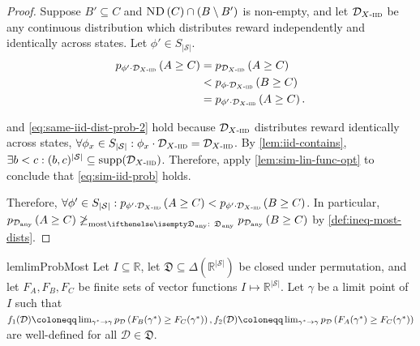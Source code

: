 \documentclass{article}
\renewcommand{\abs}[1]{\left|#1\right|}
\newcommand*{\prn}[1]{\left(#1\right)}
\newcommand*{\defeq}{\coloneqq} %
\newcommand*{\reals}{\mathbb{R}}
\newcommand*{\upsc}[1]{\text{\upshape\textsc{#1}}}
\newcommand*{\St}{\mathcal{S}}
\newcommand*{\rewardVS}{\reals^{\abs{\St}}} %
\newcommand*{\D}{\mathcal{D}} %
\newcommand*{\distSet}{\mathfrak{D}}
\newcommand*{\Dany}{\D_{\text{any}}}
\newcommand*{\DSetAny}{\distSet_\text{any}}
\newcommand*{\ND}[1]{\upsc{ND}\prn{#1}}
\newcommand*{\mdpPermGroup}{S_{\abs{\St}}}
\theoremstyle{definition}
\begin{document}
\begin{appendices}
\begin{proof}
Suppose $B'\subseteq C$ and $\ND{C}\cap \prn{B\setminus B'}$ is non-empty, and let $\Diid$ be any continuous distribution which distributes reward independently and identically across states. Let $\phi'\in\mdpPermGroup$.
\begin{align}
\phelper{A\geq C}[\phi'\cdot \Diid]&=\phelper{A\geq C}[\Diid]\label{eq:same-iid-dist-prob}\\
&<\phelper{B\geq C}[\phi\cdot \Diid]\label{eq:sim-iid-prob}\\
&=\phelper{A\geq C}[\phi'\cdot \Diid].\label{eq:same-iid-dist-prob-2}
\end{align}

 and \cref{eq:same-iid-dist-prob-2} hold because $\Diid$ distributes reward identically across states, $\forall \phi_x\in\mdpPermGroup: \phi_x\cdot \Diid=\Diid$. By \cref{lem:iid-contains}, $\exists b<c: (b,c)^{\abs{\St}}\subseteq \supp[\Diid]$. Therefore, apply \cref{lem:sim-lin-func-opt} to conclude that \cref{eq:sim-iid-prob} holds. 

Therefore, $\forall \phi'\in\mdpPermGroup:\phelper{A\geq C}[\phi'\cdot \Diid]<\phelper{B\geq C}[\phi'\cdot \Diid]$. In particular, $\phelper{A\geq C}[\Dany] \not\geqMost[][\DSetAny] \phelper{B \geq C}[\Dany]$ by \cref{def:ineq-most-dists}.
\end{proof}

\begin{restatable}{lem}{limProbMost}\label{lem:lim-prob-most}
Let $I\subseteq \reals$, let $\distSet \subseteq \Delta(\rewardVS)$ be closed under permutation, and let $F_A,F_B,F_C$ be finite sets of vector functions $I\mapsto \rewardVS$. Let $\gamma$ be a limit point of $I$ such that $f_1(\D)\defeq \lim_{\gamma^*\to \gamma}\phelper{F_B(\gamma^*)\geq F_C(\gamma^*)}[\D],f_2(\D)\defeq \lim_{\gamma^*\to \gamma}\phelper{F_A(\gamma^*)\geq F_C(\gamma^*)}[\D]$ are well-defined for all $\D\in\distSet$.


\end{restatable}
\end{appendices}
\end{document}
